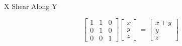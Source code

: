 \documentclass{beamer}
\begin{document}
\begin{frame}{X Shear Along Y}

\[ \left[ \begin{array}{ccc} 1 & 1 & 0\\ 0 & 1 & 0 \\ 0 & 0 & 1 \end{array} \right] \left[ \begin{array}{c} x \\ y \\ z \end{array} \right] =  \left[ \begin{array}{c} x + y \\ y \\ z \end{array} \right] \]

\begin{figure}[t]
    \captionsetup[subfloat]{labelformat=empty}
	\centering

\end{figure}
\end{frame}
\end{document}
